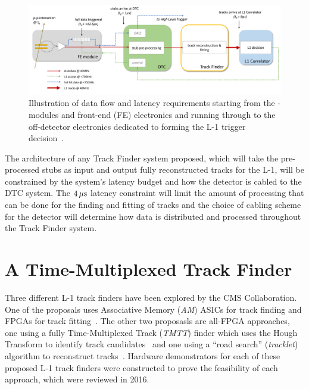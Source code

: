 \begin{figure}[h]
\centering
\includegraphics[width=\textwidth]{figs/tk-upgrade/dataflow.pdf}
\caption{Illustration of data flow and latency requirements starting from the \pt-modules and front-end (FE) electronics and running through to the off-detector electronics dedicated to forming the L-1 trigger decision~\cite{TMTT_JINST}.}
\label{fig:dataFlow}
\end{figure}

The architecture of any Track Finder system proposed, which will take the pre-processed stubs as input and output fully reconstructed tracks for the L-1, will be constrained by the system's latency budget and how the detector is cabled to the DTC system.
The $4\,\mu\text{s}$ latency constraint will limit the amount of processing that can be done for the finding and fitting of tracks and the choice of cabling scheme for the detector will determine how data is distributed and processed throughout the Track Finder system.

\section{A Time-Multiplexed Track Finder}\label{sec:TMTT}
Three different L-1 track finders have been explored by the CMS Collaboration.
One of the proposals uses Associative Memory (\emph{AM}) ASICs for track finding and FPGAs for track fitting~\cite{P2TrackerTDR,AM}.
The other two proposasls are all-FPGA approaches, one using a fully Time-Multiplexed Track (\emph{TMTT}) finder which uses the Hough Transform to identify track candidates~\cite{TMTT_JINST} and one using a ``road search'' (\emph{tracklet}) algorithm to reconstruct tracks~\cite{P2TrackerTDR,tracklet}.
Hardware demonstrators for each of these proposed L-1 track finders were constructed to prove the feasibility of each approach, which were reviewed in 2016.

